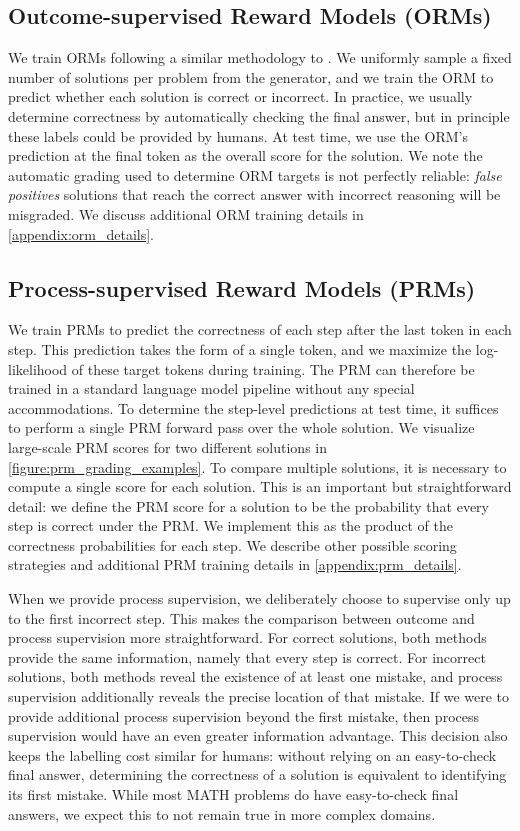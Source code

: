 \subsection{Outcome-supervised Reward Models (ORMs)} \label{section:orm}

We train ORMs following a similar methodology to \cite{cobbe2021training}. We uniformly sample a fixed number of solutions per problem from the generator, and we train the ORM to predict whether each solution is correct or incorrect. In practice, we usually determine correctness by automatically checking the final answer, but in principle these labels could be provided by humans. At test time, we use the ORM's prediction at the final token as the overall score for the solution. We note the automatic grading used to determine ORM targets is not perfectly reliable: \textit{false positives} solutions that reach the correct answer with incorrect reasoning will be misgraded. We discuss additional ORM training details in \ref{appendix:orm_details}.

\subsection{Process-supervised Reward Models (PRMs)}

We train PRMs to predict the correctness of each step after the last token in each step. This prediction takes the form of a single token, and we maximize the log-likelihood of these target tokens during training. The PRM can therefore be trained in a standard language model pipeline without any special accommodations. To determine the step-level predictions at test time, it suffices to perform a single PRM forward pass over the whole solution. We visualize large-scale PRM scores for two different solutions in \ref{figure:prm_grading_examples}. To compare multiple solutions, it is necessary to compute a single score for each solution. This is an important but straightforward detail: we define the PRM score for a solution to be the probability that every step is correct under the PRM. We implement this as the product of the correctness probabilities for each step. We describe other possible scoring strategies and additional PRM training details in \ref{appendix:prm_details}.

When we provide process supervision, we deliberately choose to supervise only up to the first incorrect step. This makes the comparison between outcome and process supervision more straightforward. For correct solutions, both methods provide the same information, namely that every step is correct. For incorrect solutions, both methods reveal the existence of at least one mistake, and process supervision additionally reveals the precise location of that mistake. If we were to provide additional process supervision beyond the first mistake, then process supervision would have an even greater information advantage. This decision also keeps the labelling cost similar for humans: without relying on an easy-to-check final answer, determining the correctness of a solution is equivalent to identifying its first mistake. While most MATH problems do have easy-to-check final answers, we expect this to not remain true in more complex domains.

